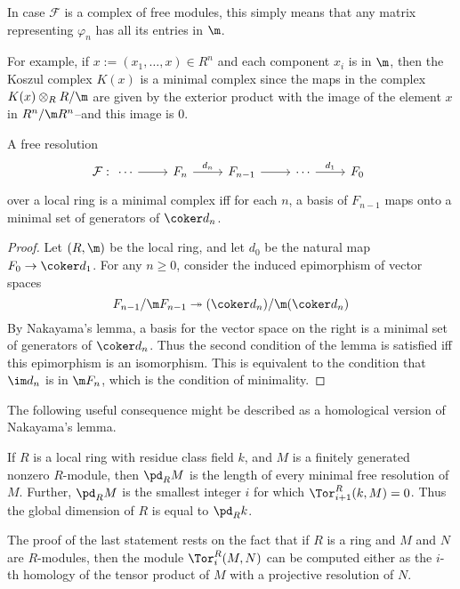 In case $\mathcal{F}$ is a complex of free modules, this simply means that any matrix representing $\varphi_n$ has all its entries in $\m$.\par
For example, if $x:=(x_1,\dots,x)\in R^n$ and each component $x_i$ is in $\m$, then the Koszul complex $K(x)$ is a minimal complex since the maps in the complex $K(x)\otimes_RR/\m$ are given by the exterior product with the image of the element $x$ in $R^n/\m R^n$--and this image is $0$.\par
\begin{lemma}
A free resolution
\[\mathcal{F}:\begin{tikzcd}
\cdots\ar[r]&F_n\ar[r,"d_n"]&F_{n-1}\ar[r]&\cdots\ar[r,"d_1"]&F_0
\end{tikzcd}\]
over a local ring is a minimal complex iff for each $n$, a basis of $F_{n-1}$ maps onto a minimal set of generators of $\coker d_n$.
\end{lemma}
\begin{proof}
Let $(R,\m)$ be the local ring, and let $d_0$ be the natural map $F_0\to\coker d_1$. For any $n\geq0$, consider the induced epimorphism of vector spaces
\[F_{n-1}/\m F_{n-1}\twoheadrightarrow(\coker d_n)/\m(\coker d_n)\]
By Nakayama's lemma, a basis for the vector space on the right is a minimal
set of generators of $\coker d_n$. Thus the second condition of the lemma is satisfied iff this epimorphism is an isomorphism. This is equivalent to the condition that $\im d_n$ is in $\m F_n$, which is the condition of minimality.
\end{proof}
The following useful consequence might be described as a homological
version of Nakayama's lemma.
\begin{corollary}\label{local gldim}
If $R$ is a local ring with residue class field $k$, and $M$ is a finitely generated nonzero $R$-module, then $\pd_RM$ is the length of every minimal free resolution of $M$. Further, $\pd_RM$ is the smallest integer $i$ for which $\Tor_{i+1}^R(k,M)=0$. Thus the global dimension of $R$ is equal to $\pd_Rk$.
\end{corollary}
The proof of the last statement rests on the fact that if $R$ is a ring and
$M$ and $N$ are $R$-modules, then the module $\Tor_i^R(M,N)$ can be computed either as the $i$-th homology of the tensor product of $M$ with a projective resolution of $N$.
